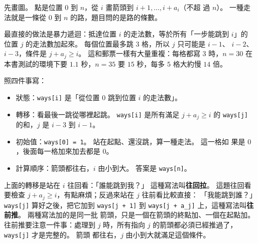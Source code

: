 先畫圖。 點是位置 $0$ 到 $n$，從 $i$ 畫箭頭到 $i + 1, \ldots, i + a_i$（不超
過 $n$）。 一種走法就是一條從 $0$ 到 $n$ 的路，題目問的是路的條數。

\begin{center}
\label{fig:hop-dag}
\end{center}

最直接的做法是暴力遞迴：抵達位置 $i$ 的走法數，等於所有「一步能跳到 $i$」的
位置 $j$ 的走法數加起來。 每個位置最多跳 $3$ 格，所以 $j$ 只可能是 $i - 1$、
$i - 2$、$i - 3$，條件是 $j + a_j \ge i$。 這和郵票一樣有大量重複：每格都寫
$3$ 時，$n = 30$ 在本書測試的環境下要 $1.1$ 秒，$n = 35$ 要 $15$ 秒，每多
$5$ 格大約慢 $14$ 倍。

照四件事寫：

\begin{itemize}
\item 狀態：\texttt{ways[i]} 是「從位置 $0$ 跳到位置 $i$ 的走法數」。
\item 轉移：看最後一跳從哪裡起跳。 \texttt{ways[i]} 是所有滿足
$j + a_j \ge i$ 的 \texttt{ways[j]} 的和，$j$ 是 $i - 3$ 到 $i - 1$。
\item 初始值：\texttt{ways[0] = 1}。 站在起點、還沒跳，算一種走法。 這一格如
果是 $0$，後面每一格加來加去都是 $0$。
\item 計算順序：箭頭都往右，$i$ 由小到大。 答案是 \texttt{ways[n]}。
\end{itemize}

上面的轉移是站在 $i$ 往回看：「誰能跳到我？」 這種寫法叫\textbf{往回拉}。
這題往回看要檢查 $j + a_j \ge i$，有點麻煩；反過來站在 $j$ 往前看比較直接：
「我能跳到誰？」 \texttt{ways[j]} 算好之後，把它加到 \texttt{ways[j + 1]} 到
\texttt{ways[j + a\_j]} 上，這種寫法叫\textbf{往前推}。 兩種寫法加的是同一批
箭頭，只是一個在箭頭的終點加、一個在起點加。 往前推要注意一件事：處理到 $j$
時，所有指向 $j$ 的箭頭都必須已經推過了，\texttt{ways[j]} 才是完整的。 箭頭
都往右，$j$ 由小到大就滿足這個條件。

